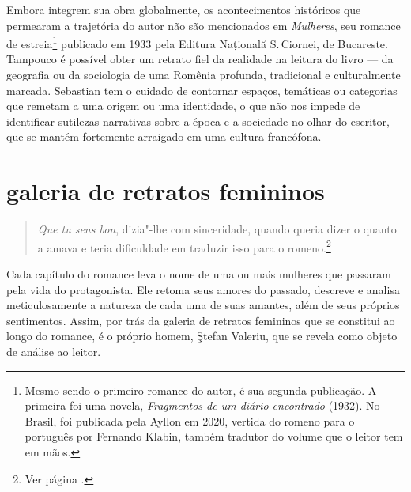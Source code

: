Embora integrem sua obra globalmente, os
acontecimentos históricos que permearam a trajetória do autor não são
mencionados em \emph{Mulheres}, seu romance de estreia\footnote{Mesmo sendo o primeiro romance do autor, é sua segunda publicação. A primeira foi uma novela, \textit{Fragmentos de um diário encontrado} (1932). No Brasil, foi publicada pela Ayllon em 2020, vertida do romeno para o português por Fernando Klabin, também tradutor do volume que o leitor tem em mãos.} publicado
em 1933 pela Editura Națională S.\,Ciornei, de Bucareste. Tampouco é possível
obter um retrato fiel da realidade na leitura do livro --- da
geografia ou da sociologia de uma Romênia profunda, tradicional e
culturalmente marcada. Sebastian tem o cuidado de contornar espaços,
temáticas ou categorias que remetam a uma origem ou uma identidade, o
que não nos impede de identificar sutilezas narrativas sobre a época e a sociedade no olhar do escritor, que se
mantém fortemente arraigado em uma cultura francófona.

\section{galeria de retratos femininos}


\begin{quote}
\emph{Que tu sens bon}, dizia"-lhe
com sinceridade, quando queria dizer o quanto a amava e teria
dificuldade em traduzir isso para o romeno.\footnote{Ver página \pageref{traduzir}.}
\end{quote}

Cada capítulo do romance leva o nome de uma ou mais mulheres que passaram
pela vida do protagonista. Ele retoma seus amores do passado,
descreve e analisa meticulosamente a natureza de cada uma de suas
amantes, além de seus próprios sentimentos.
Assim, por trás da galeria de retratos femininos que se constitui ao
longo do romance, é o próprio homem, Ştefan Valeriu, que se revela como
objeto de análise ao leitor. 


